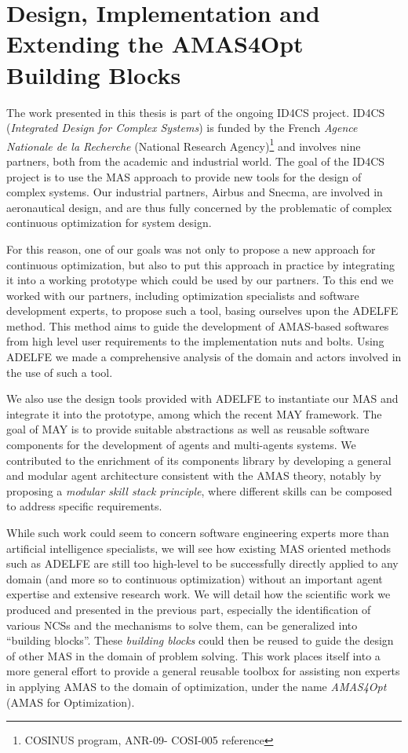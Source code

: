 \part{Design, Implementation and Extending the AMAS4Opt Building Blocks}

The work presented in this thesis is part of the ongoing ID4CS project. ID4CS (\emph{Integrated Design for Complex Systems}) is funded by the French \emph{Agence Nationale de la Recherche} (National Research Agency)\footnote{COSINUS program, ANR-09-
COSI-005 reference} and involves nine partners, both from the academic and industrial world. The goal of the ID4CS project is to use the MAS approach to provide new tools for the design of complex systems. Our industrial partners, Airbus and Snecma, are involved in aeronautical design, and are thus fully concerned by the problematic of complex continuous optimization for system design.

For this reason, one of our goals was not only to propose a new approach for continuous optimization, but also to put this approach in practice by integrating it into a working prototype which could be used by our partners. To this end we worked with our partners, including optimization specialists and software development experts, to propose such a tool, basing ourselves upon the ADELFE method. This method aims to guide the development of AMAS-based softwares from high level user requirements to the implementation nuts and bolts. Using ADELFE we made a comprehensive analysis of the domain and actors involved in the use of such a tool.

We also use the design tools provided with ADELFE to instantiate our MAS and integrate it into the prototype, among which the recent MAY framework. The goal of MAY is to provide suitable abstractions as well as reusable software components for the development of agents and multi-agents systems. We contributed to the enrichment of its components library by developing a general and modular agent architecture consistent with the AMAS theory, notably by proposing a \emph{modular skill stack principle}, where different skills can be composed to address specific requirements.

While such work could seem to concern software engineering experts more than artificial intelligence specialists, we will see how existing MAS oriented methods such as ADELFE are still too high-level to be successfully directly applied to any domain (and more so to continuous optimization) without an important agent expertise and extensive research work. We will detail how the scientific work we produced and presented in the previous part, especially the identification of various NCSs and the mechanisms to solve them, can be generalized into \enquote{building blocks}. These \emph{building blocks} could then be reused to guide the design of other MAS in the domain of problem solving. This work places itself into a more general effort to provide a general reusable toolbox for assisting non experts in applying AMAS to the domain of optimization, under the name \emph{AMAS4Opt} (AMAS for Optimization).

